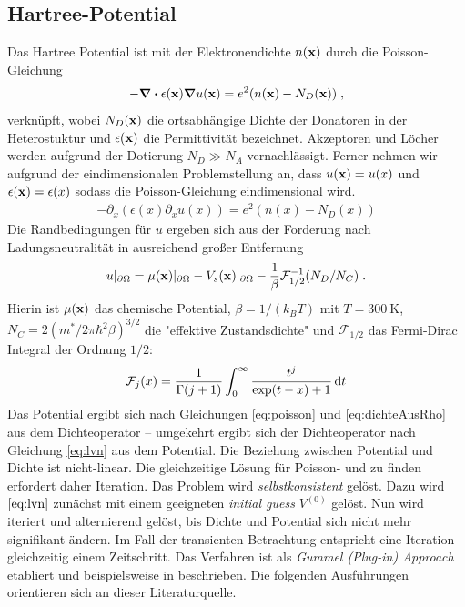\subsection{Hartree-Potential}
Das Hartree Potential ist mit der Elektronendichte $n(\vb{x})$ durch die Poisson-Gleichung \cite{frensley}
\begin{align}
  -\div \epsilon(\vb{x}) \grad u(\vb{x}) = e^2 (n(\vb{x}) - N_D(\vb{x})) \; ,
  \label{eq:poisson_3d}
\end{align}
verknüpft, wobei $N_D(\vb{x})$ die ortsabhängige Dichte der Donatoren in der Heterostuktur und $\epsilon(\vb{x})$ die Permittivität bezeichnet. Akzeptoren und Löcher werden aufgrund der Dotierung $N_D \gg N_A$ vernachlässigt. Ferner nehmen wir aufgrund der eindimensionalen Problemstellung an, dass $u(\vb{x}) = u(x)$ und $\epsilon(\vb{x})=\epsilon(x)$ sodass die Poisson-Gleichung eindimensional wird.
\begin{align}
  -\partial_x (\epsilon(x)\partial_x u(x)) = e^2(n(x)-N_D(x))
  \label{eq:poisson}
\end{align}
Die Randbedingungen für $u$ ergeben sich aus der Forderung nach Ladungsneutralität in ausreichend großer Entfernung  \cite{frensley}
\begin{align}
  u|_{\partial\Omega} = \mu(\vb{x})|_{\partial\Omega}-V_s(\vb{x})|_{\partial\Omega}-\frac{1}{\beta}\mathcal{F}_{1/2}^{-1}(N_D/N_C) \; .
  \label{eq:RB_PE}
\end{align}
Hierin ist $\mu(\vb{x})$ das chemische Potential, $\beta=1/(k_BT)$ mit $T=\SI{300}{\kelvin}$, $N_C = 2(m^*/2\pi\hbar^2\beta)^{3/2}$ die "effektive Zustandsdichte" und $\mathcal{F}_{1/2}$ das Fermi-Dirac Integral der Ordnung $1/2$:
\begin{align}
  \mathcal{F}_j(x)=\frac{1}{\Gamma(j+1)}\int_0^{\infty}\frac{t^j}{\exp(t-x)+1}\mathop{}\!\mathrm{d} t
\end{align}
Das Potential ergibt sich nach Gleichungen \eqref{eq:poisson} und \eqref{eq:dichteAusRho} aus dem Dichteoperator -- umgekehrt ergibt sich der Dichteoperator nach Gleichung \eqref{eq:lvn} aus dem Potential. Die Beziehung zwischen Potential und Dichte ist nicht-linear. Die gleichzeitige Lösung für Poisson- und \lvn zu finden erfordert daher Iteration. Das Problem wird \emph{selbstkonsistent} gelöst. Dazu wird $\eqref{eq:lvn}$ zunächst mit einem geeigneten \emph{initial guess} $V^{(0)}$ gelöst. Nun wird iteriert und alternierend gelöst, bis Dichte und Potential sich nicht mehr signifikant ändern. Im Fall der transienten Betrachtung entspricht eine Iteration gleichzeitig einem Zeitschritt. Das Verfahren ist als \emph{Gummel (Plug-in) Approach} etabliert und beispielsweise in \cite{gummel} beschrieben. Die folgenden Ausführungen orientieren sich an dieser Literaturquelle.

